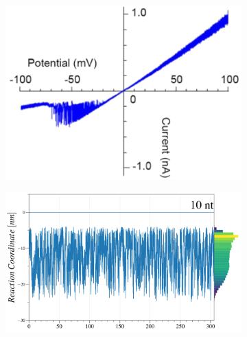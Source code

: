 \begin{figure}[ht!]
  \begin{centering}
  \hspace{.35cm}
  \begin{subfigure}[t]{\dimexpr.3\linewidth-1.3em\relax}
  \centering
  \vspace{-0.1cm}
  \includegraphics[width=1.05\linewidth,valign=t]{Figures/IV-90.png}
  \end{subfigure}%
  \hspace{.25cm}
  \vspace{-0.2cm}
  \begin{subfigure}[t]{\dimexpr.5\linewidth-1.3em\relax}
  \centering
  \includegraphics[width=.95\linewidth,valign=t]{Figures/MR-90.png}
  \end{subfigure}%
  \hspace{.3cm}
  \begin{subfigure}[t]{\dimexpr.21\linewidth-1.3em\relax}

\end{subfigure}
\end{centering}
\end{figure}

